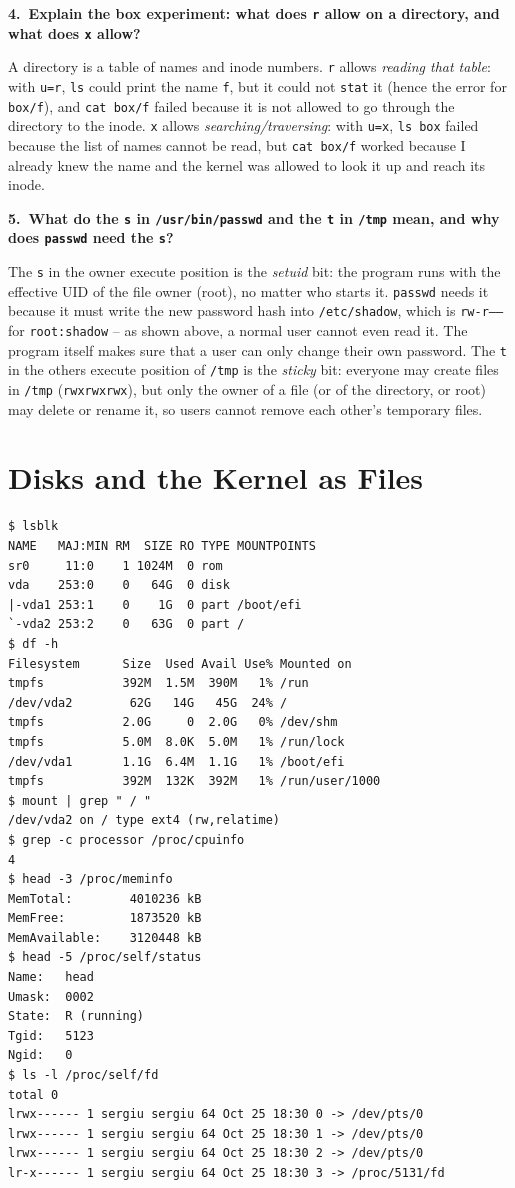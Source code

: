\documentclass[12pt,a4paper]{article}
\newcommand{\qa}[2]{%
  \par\needspace{5\baselineskip}\medskip
  \noindent\textbf{#1.~#2}\par\smallskip\noindent}
\begin{document}
\qa{4}{Explain the box experiment: what does \texttt{r} allow on a directory, and what does \texttt{x} allow?}
A directory is a table of names and inode numbers. \texttt{r} allows \textit{reading that table}: with \texttt{u=r}, \texttt{ls} could print the name \texttt{f}, but it could not \texttt{stat} it (hence the error for \texttt{box/f}), and \texttt{cat box/f} failed because it is not allowed to go through the directory to the inode. \texttt{x} allows \textit{searching/traversing}: with \texttt{u=x}, \texttt{ls box} failed because the list of names cannot be read, but \texttt{cat box/f} worked because I already knew the name and the kernel was allowed to look it up and reach its inode.

\qa{5}{What do the \texttt{s} in \texttt{/usr/bin/passwd} and the \texttt{t} in \texttt{/tmp} mean, and why does \texttt{passwd} need the \texttt{s}?}
The \texttt{s} in the owner execute position is the \textit{setuid} bit: the program runs with the effective UID of the file owner (root), no matter who starts it. \texttt{passwd} needs it because it must write the new password hash into \texttt{/etc/shadow}, which is \texttt{rw-r-----} for \texttt{root:shadow} -- as shown above, a normal user cannot even read it. The program itself makes sure that a user can only change their own password. The \texttt{t} in the others execute position of \texttt{/tmp} is the \textit{sticky} bit: everyone may create files in \texttt{/tmp} (\texttt{rwxrwxrwx}), but only the owner of a file (or of the directory, or root) may delete or rename it, so users cannot remove each other's temporary files.

\newpage
\section{Disks and the Kernel as Files}

\begin{lstlisting}[style=terminal,caption={Block devices, mounted file systems and /proc}]
$ lsblk
NAME   MAJ:MIN RM  SIZE RO TYPE MOUNTPOINTS
sr0     11:0    1 1024M  0 rom
vda    253:0    0   64G  0 disk
|-vda1 253:1    0    1G  0 part /boot/efi
`-vda2 253:2    0   63G  0 part /
$ df -h
Filesystem      Size  Used Avail Use% Mounted on
tmpfs           392M  1.5M  390M   1% /run
/dev/vda2        62G   14G   45G  24% /
tmpfs           2.0G     0  2.0G   0% /dev/shm
tmpfs           5.0M  8.0K  5.0M   1% /run/lock
/dev/vda1       1.1G  6.4M  1.1G   1% /boot/efi
tmpfs           392M  132K  392M   1% /run/user/1000
$ mount | grep " / "
/dev/vda2 on / type ext4 (rw,relatime)
$ grep -c processor /proc/cpuinfo
4
$ head -3 /proc/meminfo
MemTotal:        4010236 kB
MemFree:         1873520 kB
MemAvailable:    3120448 kB
$ head -5 /proc/self/status
Name:   head
Umask:  0002
State:  R (running)
Tgid:   5123
Ngid:   0
$ ls -l /proc/self/fd
total 0
lrwx------ 1 sergiu sergiu 64 Oct 25 18:30 0 -> /dev/pts/0
lrwx------ 1 sergiu sergiu 64 Oct 25 18:30 1 -> /dev/pts/0
lrwx------ 1 sergiu sergiu 64 Oct 25 18:30 2 -> /dev/pts/0
lr-x------ 1 sergiu sergiu 64 Oct 25 18:30 3 -> /proc/5131/fd
\end{lstlisting}
\end{document}
